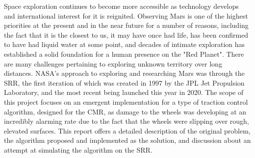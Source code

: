 Space exploration continues to become more accessible as technology develops and international interest for it is reignited. Observing Mars is one of the highest priorities at the present and in the near future for a number of reasons, including the fact that it is the closest to us, it may have once had life, has been confirmed to have had liquid water at some point, and decades of intimate exploration has established a solid foundation for a human presence on the "Red Planet". There are many challenges pertaining to exploring unknown territory over long distances. NASA's approach to exploring and researching Mars was through the \ac{SRR}, the first iteration of which was created in 1997 by the JPL Jet Propulsion Laboratory, and the most recent being launched this year in 2020. The scope of this project focuses on an emergent implementation for a type of traction control algorithm, designed for the \ac{CMR}, as damage to the wheels was developing at an incredibly alarming rate due to the fact that the wheels were slipping over rough, elevated surfaces. This report offers a detailed description of the original problem, the algorithm proposed and implemented as the solution, and discussion about an attempt at simulating the algorithm on the \ac{SRR}.
